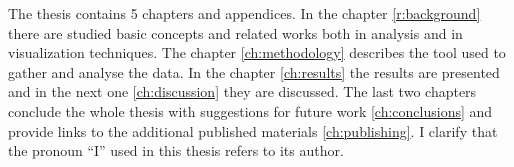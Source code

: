 
The thesis contains 5 chapters and appendices. In the chapter \ref{r:background} there are studied basic concepts and related works both in analysis and in visualization techniques. The chapter \ref{ch:methodology} describes the tool used to gather and analyse the data. In the chapter \ref{ch:results} the results are presented and in the next one \ref{ch:discussion} they are discussed. The last two chapters conclude the whole thesis with suggestions for future work \ref{ch:conclusions} and provide links to the additional published materials \ref{ch:publishing}. I clarify that the pronoun “I” used in this thesis refers to its author.




